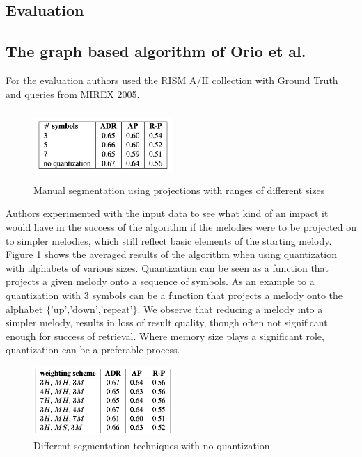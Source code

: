 \documentclass{llncs}
\begin{document}
\begin{itemize}
			
	\section{Evaluation}
		\subsection{The graph based algorithm of Orio et al.}
			For the evaluation authors used the RISM A/II collection with Ground Truth and queries from MIREX 2005.
			
			\begin{figure}[h!]
			\centering
			\includegraphics[width=200px,height=100px,keepaspectratio]{one_of_two_point_four}
			\caption{Manual segmentation using projections with ranges of different sizes \cite{two_point_four}}
			\end{figure}
            
            Authors experimented with the input data to see what kind of an impact it would have in the success of the algorithm if the melodies were to be projected on to simpler melodies, which still reflect basic elements of the starting melody. Figure 1 shows the averaged results of the algorithm when using quantization with alphabets of various sizes. Quantization can be seen as a function that projects a given melody onto a sequence of symbols. As an example to a quantization with 3 symbols can be a function that projects a melody onto the alphabet $\{\text{'up','down','repeat'}\}$. We observe that reducing a melody into a simpler melody, results in loss of result quality, though often not significant enough for success of retrieval. Where memory size plays a significant role, quantization can be a preferable process.   

			\begin{figure}[h!]
			\centering
			\includegraphics[width=200px,height=100px,keepaspectratio]{three_of_two_point_four}
			\caption{Different segmentation techniques with no quantization \cite{two_point_four}}
			\end{figure}


\end{itemize}
\end{document}
